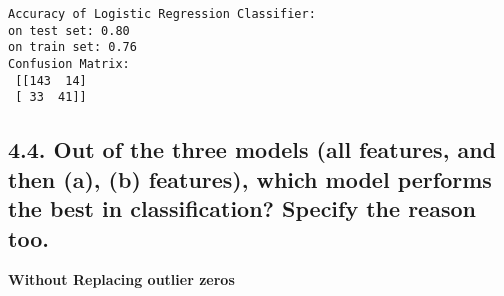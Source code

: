 \documentclass[11pt]{article}
\begin{document}
    \begin{Verbatim}[commandchars=\\\{\}]
Accuracy of Logistic Regression Classifier:
on test set: 0.80
on train set: 0.76
Confusion Matrix:
 [[143  14]
 [ 33  41]]
    \end{Verbatim}

    \hypertarget{out-of-the-three-models-all-features-and-then-a-b-features-which-model-performs-the-best-in-classification-specify-the-reason-too.}{%
\subsection{4.4. Out of the three models (all features, and then (a),
(b) features), which model performs the best in classification? Specify
the reason
too.}\label{out-of-the-three-models-all-features-and-then-a-b-features-which-model-performs-the-best-in-classification-specify-the-reason-too.}}

\textbf{Without Replacing outlier zeros}
\end{document}
